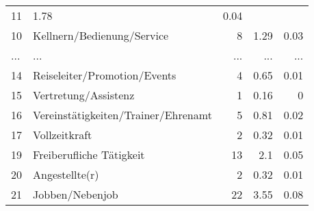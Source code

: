 \begin{longtable}{lXrrr}
          \num{11} &
          \num[round-mode=places,round-precision=2]{1,78} &
          \num[round-mode=places,round-precision=2]{0,04} \\
        10 & \multicolumn{1}{X}{Kellnern/Bedienung/Service} & %
          \num{8} &
          \num[round-mode=places,round-precision=2]{1,29} &
          \num[round-mode=places,round-precision=2]{0,03} \\
       ... & ... & ... & ... & ... \\
        14 & \multicolumn{1}{X}{Reiseleiter/Promotion/Events} & %
          \num{4} &
          \num[round-mode=places,round-precision=2]{0,65} &
          \num[round-mode=places,round-precision=2]{0,01} \\

        15 & \multicolumn{1}{X}{Vertretung/Assistenz} & %
          \num{1} &
          \num[round-mode=places,round-precision=2]{0,16} &
          \num[round-mode=places,round-precision=2]{0} \\

        16 & \multicolumn{1}{X}{Vereinstätigkeiten/Trainer/Ehrenamt} & %
          \num{5} &
          \num[round-mode=places,round-precision=2]{0,81} &
          \num[round-mode=places,round-precision=2]{0,02} \\

        17 & \multicolumn{1}{X}{Vollzeitkraft} & %
          \num{2} &
          \num[round-mode=places,round-precision=2]{0,32} &
          \num[round-mode=places,round-precision=2]{0,01} \\

        19 & \multicolumn{1}{X}{Freiberufliche Tätigkeit} & %
          \num{13} &
          \num[round-mode=places,round-precision=2]{2,1} &
          \num[round-mode=places,round-precision=2]{0,05} \\

        20 & \multicolumn{1}{X}{Angestellte(r)} & %
          \num{2} &
          \num[round-mode=places,round-precision=2]{0,32} &
          \num[round-mode=places,round-precision=2]{0,01} \\

        21 & \multicolumn{1}{X}{Jobben/Nebenjob} & %
          \num{22} &
          \num[round-mode=places,round-precision=2]{3,55} &
          \num[round-mode=places,round-precision=2]{0,08} \\


\end{longtable}
